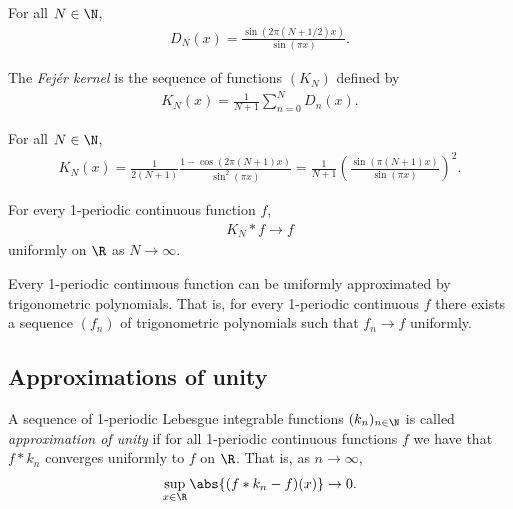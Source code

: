 \documentclass{article}
\begin{document}
\begin{lemma}[Notes 5.3]
	For all $N\in\N$,
	\begin{align*}
		D_N(x)=\frac{\sin(2\pi(N+1/2)x)}{\sin(\pi x)}.
	\end{align*}
\end{lemma}

\begin{definition}
	The \emph{Fej\'er kernel} is the sequence of functions
	$(K_N)$ defined by
	\begin{align*}
		K_N(x)=\frac{1}{N+1}\sum_{n=0}^ND_n(x).
	\end{align*}
\end{definition}

\begin{lemma}[Notes 5.4]
	For all $N\in\N$,
	\begin{align*}
		K_N(x)=\frac{1}{2(N+1)}\frac{1-\cos(2\pi(N+1)x)}{\sin^2(\pi x)}
		=\frac{1}{N+1}\left(\frac{\sin(\pi(N+1)x)}{\sin(\pi x)}\right)^2.
	\end{align*}
\end{lemma}

\begin{theorem}[Fej\'er]
	For every 1-periodic continuous function $f$,
	\begin{align*}
		K_N*f\to f
	\end{align*}
	uniformly on $\R$ as $N\to \infty$.
\end{theorem}

\begin{corollary*}
	Every 1-periodic continuous function can be uniformly approximated by trigonometric
	polynomials. That is, for every 1-periodic continuous $f$ there exists a sequence
	$(f_n)$ of trigonometric polynomials such that $f_n\to f$ uniformly.
\end{corollary*}

\subsection{Approximations of unity}

\begin{definition}
	A sequence of 1-periodic Lebesgue integrable functions $(k_n)_{n\in\N}$ is called \emph{approximation
	of unity} if for all 1-periodic continuous functions $f$ we have that $f*k_n$ converges
	uniformly to $f$ on $\R$. That is, as $n\to\infty$,
	\begin{align*}
		\sup_{x\in\R}\abs{(f*k_n-f)(x)}\to 0.
	\end{align*}
\end{definition}
\end{document}
